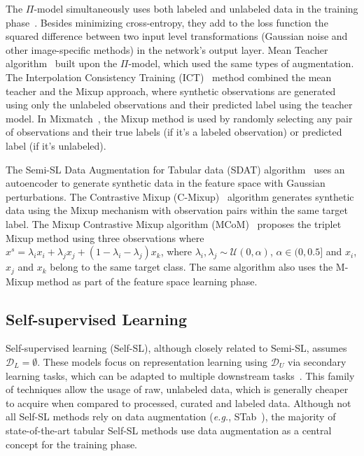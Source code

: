 \documentclass[parskip=full]{scrartcl}
\begin{document}
The $\Pi$-model simultaneously uses both labeled and unlabeled data in the
training phase~\cite{samuli2017temporal}. Besides minimizing cross-entropy,
they add to the loss function the squared difference between two input level
transformations (Gaussian noise and other image-specific methods) in the
network's output layer. Mean Teacher algorithm~\cite{tarvainen2017mean} built
upon the $\Pi$-model, which used the same types of augmentation. The
Interpolation Consistency Training (ICT)~\cite{verma2022interpolation} method
combined the mean teacher and the Mixup approach, where synthetic observations
are generated using only the unlabeled observations and their predicted label
using the teacher model. In Mixmatch~\cite{berthelot2019mixmatch}, the Mixup
method is used by randomly selecting any pair of observations and their true
labels (if it's a labeled observation) or predicted label (if it's unlabeled).

The Semi-SL Data Augmentation for Tabular data (SDAT)
algorithm~\cite{fang2022semi} uses an autoencoder to generate synthetic data
in the feature space with Gaussian perturbations. The Contrastive Mixup
(C-Mixup)~\cite{darabi2021contrastive} algorithm generates synthetic data
using the Mixup mechanism with observation pairs within the same target label.
The Mixup Contrastive Mixup algorithm (MCoM)~\cite{li2022mcom} proposes the
triplet Mixup method using three observations where $x^s = \lambda_ix_i +
\lambda_jx_j + (1-\lambda_i-\lambda_j)x_k$, where $\lambda_i, \lambda_j \sim
\mathcal{U}(0, \alpha)$, $\alpha \in (0, 0.5]$ and $x_i$, $x_j$ and $x_k$
belong to the same target class. The same algorithm also uses the M-Mixup
method as part of the feature space learning phase.


\subsection{Self-supervised Learning}\label{sec:self-supervised-learning}

Self-supervised learning (Self-SL), although closely related to Semi-SL,
assumes $\mathcal{D}_L = \emptyset$. These models focus
on representation learning using $\mathcal{D}_U$ via secondary learning
tasks, which can be adapted to multiple downstream
tasks~\cite{liu2021self}. This family of techniques allow the usage of raw,
unlabeled data, which is generally cheaper to acquire when compared to
processed, curated and labeled data. Although not all Self-SL methods rely on
data augmentation (\textit{e.g.}, STab~\cite{hajiramezanali2022stab}), the
majority of state-of-the-art tabular Self-SL methods use data augmentation as
a central concept for the training phase.
\end{document}
